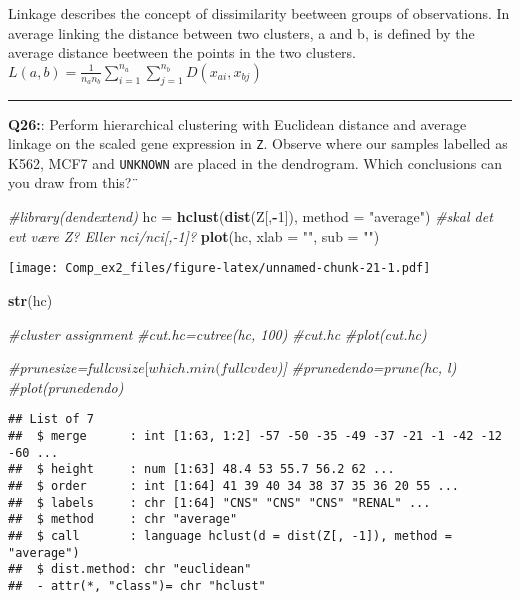 \documentclass[]{article}
\newenvironment{Shaded}{\begin{snugshade}}{\end{snugshade}}
\newcommand{\KeywordTok}[1]{\textcolor[rgb]{0.13,0.29,0.53}{\textbf{#1}}}
\newcommand{\DataTypeTok}[1]{\textcolor[rgb]{0.13,0.29,0.53}{#1}}
\newcommand{\DecValTok}[1]{\textcolor[rgb]{0.00,0.00,0.81}{#1}}
\newcommand{\StringTok}[1]{\textcolor[rgb]{0.31,0.60,0.02}{#1}}
\newcommand{\CommentTok}[1]{\textcolor[rgb]{0.56,0.35,0.01}{\textit{#1}}}
\newcommand{\OperatorTok}[1]{\textcolor[rgb]{0.81,0.36,0.00}{\textbf{#1}}}
\newcommand{\NormalTok}[1]{#1}
\begin{document}
Linkage describes the concept of dissimilarity beetween groups of
observations. In average linking the distance between two clusters, a
and b, is defined by the average distance beetween the points in the two
clusters.
\(L(a,b)=\frac{1}{n_an_b}\sum_{i=1}^{n_a}\sum_{j=1}^{n_b}D(x_{ai},x_{bj})\)

\begin{center}\rule{0.5\linewidth}{\linethickness}\end{center}

\textbf{Q26:}: Perform hierarchical clustering with Euclidean distance
and average linkage on the scaled gene expression in \texttt{Z}. Observe
where our samples labelled as K562, MCF7 and \texttt{UNKNOWN} are placed
in the dendrogram. Which conclusions can you draw from this?¨

\begin{Shaded}
\begin{Highlighting}[]
\CommentTok{#library(dendextend)}
\NormalTok{hc =}\StringTok{ }\KeywordTok{hclust}\NormalTok{(}\KeywordTok{dist}\NormalTok{(Z[,}\OperatorTok{-}\DecValTok{1}\NormalTok{]), }\DataTypeTok{method =} \StringTok{"average"}\NormalTok{)}
\CommentTok{#skal det evt være Z? Eller nci/nci[,-1]?}
\KeywordTok{plot}\NormalTok{(hc, }\DataTypeTok{xlab =} \StringTok{""}\NormalTok{, }\DataTypeTok{sub =} \StringTok{""}\NormalTok{)}
\end{Highlighting}
\end{Shaded}

\texttt{[image: Comp\_ex2\_files/figure-latex/unnamed-chunk-21-1.pdf]}

\begin{Shaded}
\begin{Highlighting}[]
\KeywordTok{str}\NormalTok{(hc)}

\CommentTok{#cluster assignment}
\CommentTok{#cut.hc=cutree(hc, 100)}
\CommentTok{#cut.hc}
\CommentTok{#plot(cut.hc)}

\CommentTok{#prunesize=fullcv$size[which.min(fullcv$dev)]}
\CommentTok{#prunedendo=prune(hc, l) }
\CommentTok{#plot(prunedendo)}
\end{Highlighting}
\end{Shaded}

\begin{verbatim}
## List of 7
##  $ merge      : int [1:63, 1:2] -57 -50 -35 -49 -37 -21 -1 -42 -12 -60 ...
##  $ height     : num [1:63] 48.4 53 55.7 56.2 62 ...
##  $ order      : int [1:64] 41 39 40 34 38 37 35 36 20 55 ...
##  $ labels     : chr [1:64] "CNS" "CNS" "CNS" "RENAL" ...
##  $ method     : chr "average"
##  $ call       : language hclust(d = dist(Z[, -1]), method = "average")
##  $ dist.method: chr "euclidean"
##  - attr(*, "class")= chr "hclust"
\end{verbatim}
\end{document}
